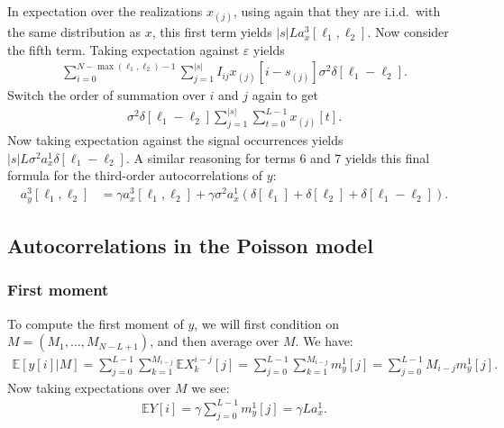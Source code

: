 \documentclass[12pt]{article}
\newcommand{\E}{\mathbb{E}}
\newcommand{\1}{\mathbf{1}}
\newcommand{\TODO}[1]{{\color{red}{[#1]}}}
\theoremstyle{plain}
\theoremstyle{definition}
\theoremstyle{remark}
\theoremstyle{plain}
\theoremstyle{remark}
\theoremstyle{plain}
\theoremstyle{plain}
\theoremstyle{plain}
\numberwithin{equation}{section}
\begin{document}
In expectation over the realizations $x_{(j)}$, using again that they are i.i.d.\ with the same distribution as $x$, this first term yields $|s|L a_x^3[\ell_1, \ell_2]$. Now consider the fifth term. Taking expectation against $\varepsilon$ yields
\begin{align}
\sum_{i=0}^{N-\max(\ell_1, \ell_2)-1} \sum_{j = 1}^{|s|} I_{ij} x_{(j)}[i-s_{(j)}] \sigma^2 \delta[\ell_1 - \ell_2].
\end{align}
Switch the order of summation over $i$ and $j$ again to get
\begin{align}
\sigma^2 \delta[\ell_1 - \ell_2] \sum_{j = 1}^{|s|} \sum_{t=0}^{L-1} x_{(j)}[t].
\end{align}
Now taking expectation against the signal occurrences yields $|s|L \sigma^2 a_x^1 \delta[\ell_1 - \ell_2]$. A similar reasoning for terms 6 and 7 yields this final formula for the third-order autocorrelations of $y$:
\begin{align}
a_y^3[\ell_1, \ell_2] & = \gamma a_x^3[\ell_1, \ell_2] + \gamma \sigma^2 a_x^1 \left( \delta[\ell_1] + \delta[\ell_2] + \delta[\ell_1 - \ell_2] \right).
\end{align}


\subsection{Autocorrelations in the Poisson model} \label{sec:proof_prop_poisson}

\TODO{Needs a complete rewrite to match the paper, in particular the modified notation and the fact we only work with autocorrelations now (not models).}

\subsubsection{First moment}

To compute the first moment of $y$, we will first condition on $M = (M_1,\dots,M_{N-L+1})$, and then average over $M$. We have:
%
\begin{align}
%
\E[y[i] | M] = \sum_{j=0}^{L-1} \sum_{k=1}^{M_{i-j}} \E X_k^{i-j}[j]
= \sum_{j=0}^{L-1} \sum_{k=1}^{M_{i-j}} m_y^1[j]
= \sum_{j=0}^{L-1} M_{i-j} m_y^1[j].
%
\end{align}
%
Now taking expectations over $M$ we see:
%
\begin{align}
%
\E Y[i] = \gamma \sum_{j=0}^{L-1}  m_y^1[j] = \gamma La_x^1.
%
\end{align}


%
\end{document}
